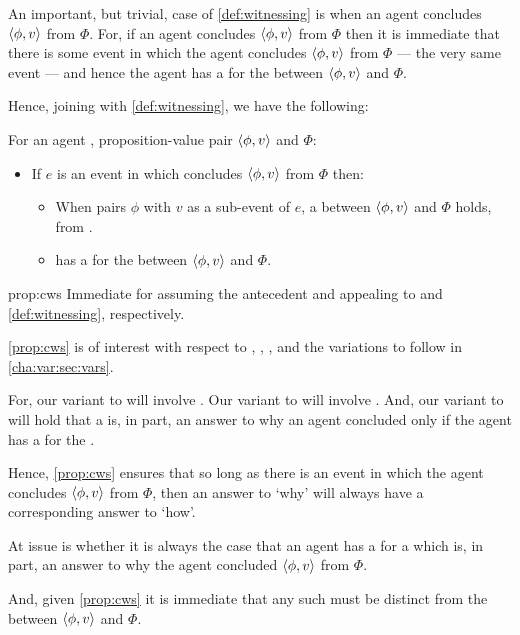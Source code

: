 \begin{note}
  An important, but trivial, case of \autoref{def:witnessing} is when an agent concludes \(\langle \phi, v \rangle\) from \(\Phi\).
  For, if an agent concludes \(\langle \phi, v \rangle\) from \(\Phi\) then it is immediate that there is some event in which the agent concludes \(\langle \phi, v \rangle\) from \(\Phi\) --- the very same event --- and hence the agent has a \wit{} for the \ros{} between \(\langle \phi, v \rangle\) and \(\Phi\).

  Hence, joining \supportI{} with \autoref{def:witnessing}, we have the following:

  \begin{proposition}
    \label{prop:cws}
    For an agent \vAgent{}, proposition-value pair \(\langle \phi, v \rangle\) and \poP{} \(\Phi\):
    \begin{itemize}
    \item
      If \(e\) is an event in which \vAgent{} concludes \(\langle \phi, v \rangle\) from \(\Phi\) then:
      \begin{itemize}
      \item
        When \vAgent{} pairs \(\phi\) with \(v\) as a sub-event of \(e\), a \ros{} between \(\langle \phi, v \rangle\) and \(\Phi\) holds, from .
      \item
        \vAgent{} has a \wit{} for the \ros{} between \(\langle \phi, v \rangle\) and \(\Phi\).
      \end{itemize}
    \end{itemize}
    \vspace{-\baselineskip}
  \end{proposition}

  \begin{argument}{prop:cws}
    Immediate for assuming the antecedent and appealing to \supportI{} and \autoref{def:witnessing}, respectively.
  \end{argument}

  \autoref{prop:cws} is of interest with respect to \qWhy{}, \qHow{}, \issueInclusion{}, and the variations to follow in \autoref{cha:var:sec:vars}.

  For, our variant to \qWhy{} will involve .
  Our variant to \qHow{} will involve .
  And, our variant to \issueInclusion{} will hold that a \ros{} is, in part, an answer to why an agent concluded only if the agent has a \wit{} for the \ros{}.

  Hence, \autoref{prop:cws} ensures that so long as there is an event in which the agent concludes \(\langle \phi, v \rangle\) from \(\Phi\), then an answer to `why' will always have a corresponding answer to `how'.

  At issue is whether it is always the case that an agent has a \wit{} for a \ros{} which is, in part, an answer to why the agent concluded \(\langle \phi, v \rangle\) from \(\Phi\).

  And, given \autoref{prop:cws} it is immediate that any such \ros{} must be distinct from the \ros{} between \(\langle \phi, v \rangle\) and \(\Phi\).
\end{note}

